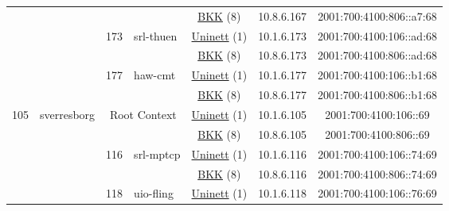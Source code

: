 \begin{small}
\begin{center}
\begin{longtable}{|c|c|c|c|c|c|c|c|}
  &  &  &  & \multicolumn{2}{|c|}{\tiny{\href{http://bkk.no}{BKK} (8)}} & \tiny{10.8.6.167} & \tiny{2001:700:4100:806::a7:68} \\* \cline{3-3}\cline{4-4}\cline{5-5}\cline{6-6}\cline{7-7}\cline{8-8}
  &  & \multirow{2}{*}{\tiny{173}} & \multicolumn{1}{|l|}{\multirow{2}{*}{\tiny{srl-thuen}}} & \multicolumn{2}{|c|}{\tiny{\href{https://www.uninett.no}{Uninett} (1)}} & \tiny{10.1.6.173} & \tiny{2001:700:4100:106::ad:68} \\* \cline{5-5}\cline{6-6}\cline{7-7}\cline{8-8}
  &  &  &  & \multicolumn{2}{|c|}{\tiny{\href{http://bkk.no}{BKK} (8)}} & \tiny{10.8.6.173} & \tiny{2001:700:4100:806::ad:68} \\* \cline{3-3}\cline{4-4}\cline{5-5}\cline{6-6}\cline{7-7}\cline{8-8}
  &  & \multirow{2}{*}{\tiny{177}} & \multicolumn{1}{|l|}{\multirow{2}{*}{\tiny{haw-cmt}}} & \multicolumn{2}{|c|}{\tiny{\href{https://www.uninett.no}{Uninett} (1)}} & \tiny{10.1.6.177} & \tiny{2001:700:4100:106::b1:68} \\* \cline{5-5}\cline{6-6}\cline{7-7}\cline{8-8}
  &  &  &  & \multicolumn{2}{|c|}{\tiny{\href{http://bkk.no}{BKK} (8)}} & \tiny{10.8.6.177} & \tiny{2001:700:4100:806::b1:68} \\ \hline
 \multirow{26}{*}{\tiny{105}} & \multicolumn{1}{|l|}{\multirow{26}{*}{\tiny{sverresborg}}} & \multicolumn{2}{|c|}{\multirow{2}{*}{\tiny{Root Context}}} & \multicolumn{2}{|c|}{\tiny{\href{https://www.uninett.no}{Uninett} (1)}} & \tiny{10.1.6.105} & \tiny{2001:700:4100:106::69} \\* \cline{5-5}\cline{6-6}\cline{7-7}\cline{8-8}
  &  & \multicolumn{2}{|c|}{} & \multicolumn{2}{|c|}{\tiny{\href{http://bkk.no}{BKK} (8)}} & \tiny{10.8.6.105} & \tiny{2001:700:4100:806::69} \\* \cline{3-3}\cline{4-4}\cline{5-5}\cline{6-6}\cline{7-7}\cline{8-8}
  &  & \multirow{2}{*}{\tiny{116}} & \multicolumn{1}{|l|}{\multirow{2}{*}{\tiny{srl-mptcp}}} & \multicolumn{2}{|c|}{\tiny{\href{https://www.uninett.no}{Uninett} (1)}} & \tiny{10.1.6.116} & \tiny{2001:700:4100:106::74:69} \\* \cline{5-5}\cline{6-6}\cline{7-7}\cline{8-8}
  &  &  &  & \multicolumn{2}{|c|}{\tiny{\href{http://bkk.no}{BKK} (8)}} & \tiny{10.8.6.116} & \tiny{2001:700:4100:806::74:69} \\* \cline{3-3}\cline{4-4}\cline{5-5}\cline{6-6}\cline{7-7}\cline{8-8}
  &  & \multirow{2}{*}{\tiny{118}} & \multicolumn{1}{|l|}{\multirow{2}{*}{\tiny{uio-fling}}} & \multicolumn{2}{|c|}{\tiny{\href{https://www.uninett.no}{Uninett} (1)}} & \tiny{10.1.6.118} & \tiny{2001:700:4100:106::76:69} \\* \cline{5-5}\cline{6-6}\cline{7-7}\cline{8-8}

\end{longtable}
\end{center}
\end{small}
